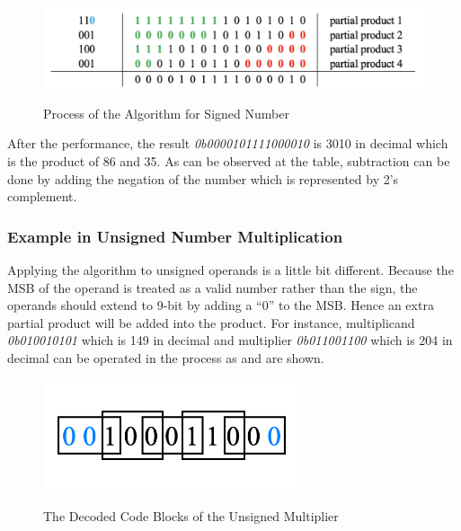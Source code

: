 \begin{figure}[!ht]
	\centering
	\caption{Process of the Algorithm for Signed Number}
	\includegraphics[width=5.7in]{../img/r4b_process_1.png}
	\label{fig:r4b_process_1}
\end{figure}

After the performance, the result \textit{0b0000101111000010} is 3010 in decimal which is the product of 86 and 35.
As can be observed at the table, subtraction can be done by adding the negation of the number which is represented
by 2’s complement.

\subsubsection{Example in Unsigned Number Multiplication}

Applying the algorithm to unsigned operands is a little bit different.
Because the MSB of the operand is treated as a valid number rather than the sign,
the operands should extend to 9-bit by adding a “0” to the MSB. Hence an extra partial product will be added into the product.
For instance, multiplicand \textit{0b010010101} which is 149 in decimal and multiplier \textit{0b011001100}
which is 204 in decimal can be operated in the process as  and  are shown.

\begin{figure}[!ht]
	\centering
	\caption{The Decoded Code Blocks of the Unsigned Multiplier}
	\includegraphics[width=3in]{../img/booth_code_2.png}
	\label{fig:booth_code_2}
\end{figure}

